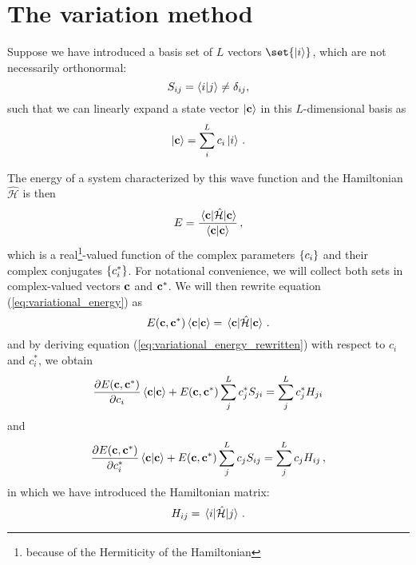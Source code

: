 \section{The variation method}
    Suppose we have introduced a basis set of $L$ vectors $\set{\ket{i}}$, which are not necessarily orthonormal:
    \begin{equation}
        S_{ij} = \braket{i}{j} \neq \delta_{ij} ,
    \end{equation}
    such that we can linearly expand a state vector $\ket{\vb{c}}$ in this $L$-dimensional basis as
    \begin{equation}
        \ket{\vb{c}} = \sum_i^L c_i \ket{i} \thinspace .
    \end{equation}

    The energy of a system characterized by this wave function and the Hamiltonian $\hat{\mathcal{H}}$ is then
    \begin{equation} \label{eq:variational_energy}
        E = \frac{\ev{\hat{\mathcal{H}}}{\vb{c}}}{\braket{\vb{c}}} \thinspace ,
    \end{equation}
    which is a real\footnote{because of the Hermiticity of the Hamiltonian}-valued function of the complex parameters $\qty{c_i}$ and their complex conjugates $\qty{c_i^*}$. For notational convenience, we will collect both sets in complex-valued vectors $\vb{c}$ and $\vb{c}^*$. We will then rewrite equation (\ref{eq:variational_energy}) as
    \begin{equation} \label{eq:variational_energy_rewritten}
        E(\vb{c}, \vb{c}^*) \braket{\vb{c}} = \ev{\hat{\mathcal{H}}}{\vb{c}} \thinspace .
    \end{equation}
    and by deriving equation (\ref{eq:variational_energy_rewritten}) with respect to $c_i$ and $c_i^*$, we obtain
    \begin{equation}
        \pdv{E(\vb{c}, \vb{c}^*)}{c_i} \braket{\vb{c}} + E(\vb{c}, \vb{c}^*) \sum_j^L c_j^* S_{ji} = \sum_j^L c_j^* H_{ji}
    \end{equation}
    and
    \begin{equation}
        \pdv{E(\vb{c}, \vb{c}^*)}{c_i^*} \braket{\vb{c}} + E(\vb{c}, \vb{c}^*) \sum_j^L c_j S_{ij} = \sum_j^L c_j H_{ij} \thinspace ,
    \end{equation}
    in which we have introduced the Hamiltonian matrix:
    \begin{equation}
        H_{ij} = \matrixel{i}{\hat{\mathcal{H}}}{j} \thinspace .
    \end{equation}

